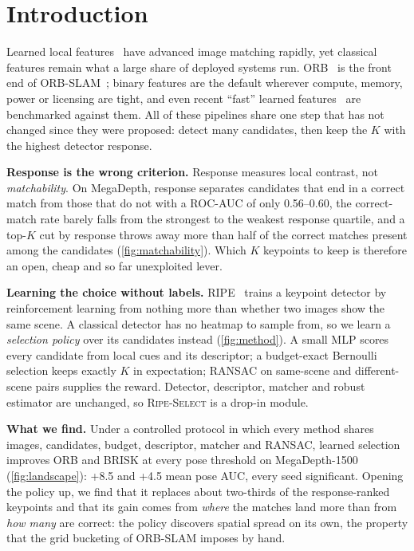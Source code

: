 \documentclass[10pt,twocolumn,letterpaper]{article}
\newcommand{\ours}{\textup{\textsc{Ripe-Select}}\xspace}
\newcommand{\q}[1]{\noindent\textbf{#1}\hspace{0.4em}}
\begin{document}
\section{Introduction}
\label{sec:intro}

Learned local features~\cite{detone2018superpoint,tyszkiewicz2020disk,zhao2023aliked,kunzel2025ripe} have
advanced image matching rapidly, yet classical features remain what a large share of deployed systems run.
ORB~\cite{rublee2011orb} is the front end of ORB-SLAM~\cite{murartal2015orbslam}; binary features are the
default wherever compute, memory, power or licensing are tight, and even recent ``fast'' learned
features~\cite{potje2024xfeat,kanakis2023zippypoint} are benchmarked against them. All of these pipelines share
one step that has not changed since they were proposed: detect many candidates, then keep the $K$ with the
highest detector response.

\q{Response is the wrong criterion.} Response measures local contrast, not \emph{matchability}. On MegaDepth,
response separates candidates that end in a correct match from those that do not with a ROC-AUC of only
0.56--0.60, the correct-match rate barely falls from the strongest to the weakest response quartile, and a
top-$K$ cut by response throws away more than half of the correct matches present among the candidates
(\cref{fig:matchability}). Which $K$ keypoints to keep is therefore an open, cheap and so far unexploited lever.

\q{Learning the choice without labels.} RIPE~\cite{kunzel2025ripe} trains a keypoint detector by reinforcement
learning from nothing more than whether two images show the same scene. A classical detector has no heatmap to
sample from, so we learn a \emph{selection policy} over its candidates instead (\cref{fig:method}). A small MLP
scores every candidate from local cues and its descriptor; a budget-exact Bernoulli selection keeps exactly $K$ in
expectation; RANSAC on same-scene and different-scene pairs supplies the reward. Detector, descriptor, matcher
and robust estimator are unchanged, so \ours is a drop-in module.

\q{What we find.} Under a controlled protocol in which every method shares images, candidates, budget,
descriptor, matcher and RANSAC, learned selection improves ORB and BRISK at every pose threshold on
MegaDepth-1500 (\cref{fig:landscape}): +8.5 and +4.5 mean pose AUC, every seed significant. Opening the policy
up, we find that it replaces about two-thirds of the response-ranked keypoints and that its gain comes from
\emph{where} the matches land more than from \emph{how many} are correct: the policy discovers spatial spread
on its own, the property that the grid bucketing of ORB-SLAM imposes by hand.
\end{document}

